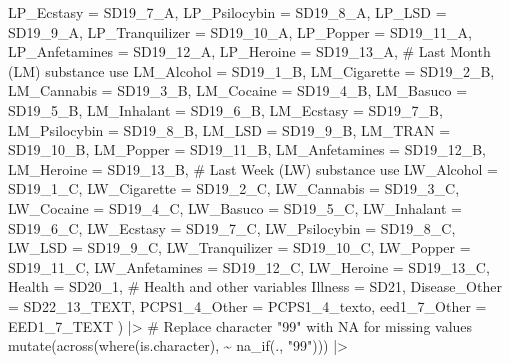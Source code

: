 \documentclass[
  bookmarksnumbered]{article}
\newenvironment{Shaded}{\begin{snugshade}}{\end{snugshade}}
\newcommand{\AttributeTok}[1]{\textcolor[rgb]{0.80,0.80,0.80}{#1}}
\newcommand{\CommentTok}[1]{\textcolor[rgb]{0.50,0.62,0.50}{#1}}
\newcommand{\FunctionTok}[1]{\textcolor[rgb]{0.94,0.94,0.56}{#1}}
\newcommand{\NormalTok}[1]{\textcolor[rgb]{0.80,0.80,0.80}{#1}}
\newcommand{\SpecialCharTok}[1]{\textcolor[rgb]{0.86,0.64,0.64}{#1}}
\newcommand{\StringTok}[1]{\textcolor[rgb]{0.80,0.58,0.58}{#1}}
\begin{document}
\begin{Shaded}
\begin{Highlighting}[]
    \AttributeTok{LP\_Ecstasy =}\NormalTok{ SD19\_7\_A,}
    \AttributeTok{LP\_Psilocybin =}\NormalTok{ SD19\_8\_A,}
    \AttributeTok{LP\_LSD =}\NormalTok{ SD19\_9\_A,}
    \AttributeTok{LP\_Tranquilizer =}\NormalTok{ SD19\_10\_A,}
    \AttributeTok{LP\_Popper =}\NormalTok{ SD19\_11\_A,}
    \AttributeTok{LP\_Anfetamines =}\NormalTok{ SD19\_12\_A,}
    \AttributeTok{LP\_Heroine =}\NormalTok{ SD19\_13\_A,}
    \CommentTok{\# Last Month (LM) substance use}
    \AttributeTok{LM\_Alcohol =}\NormalTok{ SD19\_1\_B,}
    \AttributeTok{LM\_Cigarette =}\NormalTok{ SD19\_2\_B,}
    \AttributeTok{LM\_Cannabis =}\NormalTok{ SD19\_3\_B,}
    \AttributeTok{LM\_Cocaine =}\NormalTok{ SD19\_4\_B,}
    \AttributeTok{LM\_Basuco =}\NormalTok{ SD19\_5\_B,}
    \AttributeTok{LM\_Inhalant =}\NormalTok{ SD19\_6\_B,}
    \AttributeTok{LM\_Ecstasy =}\NormalTok{ SD19\_7\_B,}
    \AttributeTok{LM\_Psilocybin =}\NormalTok{ SD19\_8\_B,}
    \AttributeTok{LM\_LSD =}\NormalTok{ SD19\_9\_B,}
    \AttributeTok{LM\_TRAN =}\NormalTok{ SD19\_10\_B,}
    \AttributeTok{LM\_Popper =}\NormalTok{ SD19\_11\_B,}
    \AttributeTok{LM\_Anfetamines =}\NormalTok{ SD19\_12\_B,}
    \AttributeTok{LM\_Heroine =}\NormalTok{ SD19\_13\_B,}
    \CommentTok{\# Last Week (LW) substance use}
    \AttributeTok{LW\_Alcohol =}\NormalTok{ SD19\_1\_C,}
    \AttributeTok{LW\_Cigarette =}\NormalTok{ SD19\_2\_C,}
    \AttributeTok{LW\_Cannabis =}\NormalTok{ SD19\_3\_C,}
    \AttributeTok{LW\_Cocaine =}\NormalTok{ SD19\_4\_C,}
    \AttributeTok{LW\_Basuco =}\NormalTok{ SD19\_5\_C,}
    \AttributeTok{LW\_Inhalant =}\NormalTok{ SD19\_6\_C,}
    \AttributeTok{LW\_Ecstasy =}\NormalTok{ SD19\_7\_C,}
    \AttributeTok{LW\_Psilocybin =}\NormalTok{ SD19\_8\_C,}
    \AttributeTok{LW\_LSD =}\NormalTok{ SD19\_9\_C,}
    \AttributeTok{LW\_Tranquilizer =}\NormalTok{ SD19\_10\_C,}
    \AttributeTok{LW\_Popper =}\NormalTok{ SD19\_11\_C,}
    \AttributeTok{LW\_Anfetamines =}\NormalTok{ SD19\_12\_C,}
    \AttributeTok{LW\_Heroine =}\NormalTok{ SD19\_13\_C,}
    \AttributeTok{Health =}\NormalTok{ SD20\_1,}
    \CommentTok{\# Health and other variables}
    \AttributeTok{Illness =}\NormalTok{ SD21,}
    \AttributeTok{Disease\_Other =}\NormalTok{ SD22\_13\_TEXT,}
    \AttributeTok{PCPS1\_4\_Other =}\NormalTok{ PCPS1\_4\_texto,}
    \AttributeTok{eed1\_7\_Other =}\NormalTok{ EED1\_7\_TEXT}
\NormalTok{  ) }\SpecialCharTok{|\textgreater{}}
  \CommentTok{\# Replace character "99" with NA for missing values}
  \FunctionTok{mutate}\NormalTok{(}\FunctionTok{across}\NormalTok{(}\FunctionTok{where}\NormalTok{(is.character), }\SpecialCharTok{\textasciitilde{}} \FunctionTok{na\_if}\NormalTok{(., }\StringTok{"99"}\NormalTok{))) }\SpecialCharTok{|\textgreater{}}

\end{Highlighting}
\end{Shaded}
\end{document}
